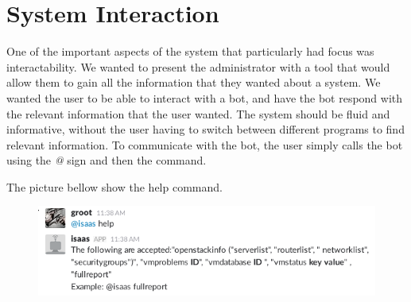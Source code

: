 \documentclass[12pt]{article}
\begin{document}
\section{System Interaction}
One of the important aspects of the system that particularly had focus was interactability. We wanted to present the administrator with a tool that would allow them to gain all the information that they wanted about a system. We wanted the user to be able to interact with a bot, and have the bot respond with the relevant information that the user wanted. The system should be fluid and informative, without the user having to switch between different programs to find relevant information. To communicate with the bot, the user simply calls the bot using the \emph{@} sign and then the command.

The picture bellow show the help command.
\begin{figure}[H]
    \begin{mdframed}
    \includegraphics[scale=.5]{./pic/2017-06-26-113851_606x161_scrot.png}
    \end{mdframed}
\end{figure}
\end{document}
